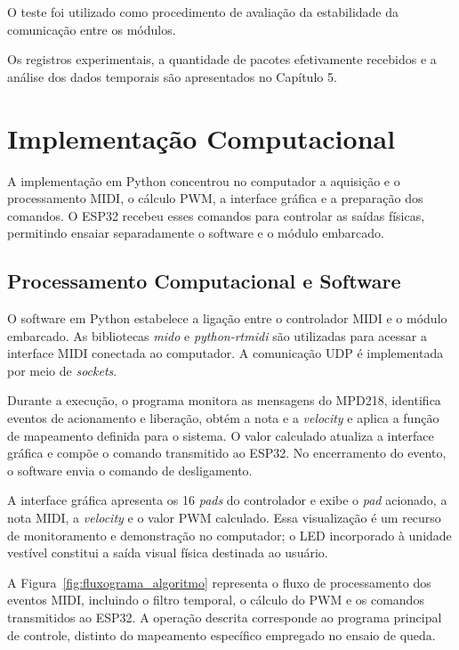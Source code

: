 O teste foi utilizado como procedimento de avaliação da estabilidade da comunicação entre os módulos.

Os registros experimentais, a quantidade de pacotes efetivamente recebidos e a análise dos dados temporais são apresentados no Capítulo 5.

\section{Implementação Computacional}
\label{sec:implementacao_computacional}

A implementação em Python concentrou no computador a aquisição e o processamento MIDI, o cálculo PWM, a interface gráfica e a preparação dos comandos. O ESP32 recebeu esses comandos para controlar as saídas físicas, permitindo ensaiar separadamente o software e o módulo embarcado.

\subsection{Processamento Computacional e Software}
\label{sec:processamento_software}

O software em Python estabelece a ligação entre o controlador MIDI e o módulo embarcado. As bibliotecas \textit{mido} e \textit{python-rtmidi} são utilizadas para acessar a interface MIDI conectada ao computador. A comunicação UDP é implementada por meio de \textit{sockets}.

Durante a execução, o programa monitora as mensagens do MPD218, identifica eventos de acionamento e liberação, obtém a nota e a \textit{velocity} e aplica a função de mapeamento definida para o sistema. O valor calculado atualiza a interface gráfica e compõe o comando transmitido ao ESP32. No encerramento do evento, o software envia o comando de desligamento.

A interface gráfica apresenta os 16 \textit{pads} do controlador e exibe o \textit{pad} acionado, a nota MIDI, a \textit{velocity} e o valor PWM calculado. Essa visualização é um recurso de monitoramento e demonstração no computador; o LED incorporado à unidade vestível constitui a saída visual física destinada ao usuário.

A Figura~\ref{fig:fluxograma_algoritmo} representa o fluxo de processamento dos eventos MIDI, incluindo o filtro temporal, o cálculo do PWM e os comandos transmitidos ao ESP32. A operação descrita corresponde ao programa principal de controle, distinto do mapeamento específico empregado no ensaio de queda.


